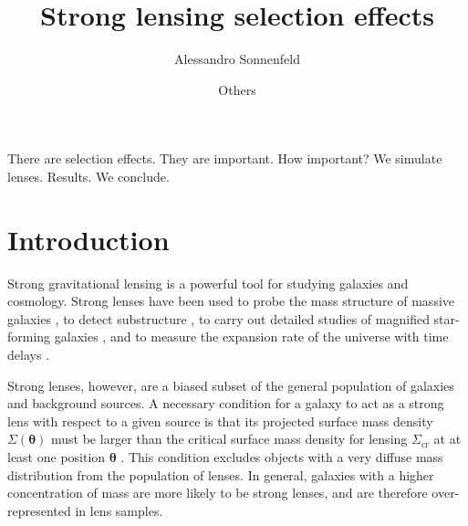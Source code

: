 \documentclass{aa}
\begin{document}
 


   \title{Strong lensing selection effects}

   \author{Alessandro Sonnenfeld\and
           Others
          }


   \date{}

 
  \abstract
    {
There are selection effects. They are important.
}
   {
How important?
} 
   {
We simulate lenses.
}
   {
Results.
}
   {
We conclude.
}

   \maketitle
%

\section{Introduction}\label{sect:intro}

Strong gravitational lensing is a powerful tool for studying galaxies and cosmology.
Strong lenses have been used to probe the mass structure of massive galaxies \citep{Aug++10, ORF14, Son++15, Sha++21}, to detect substructure \citep{Veg++12, Hez++16, Nie++20}, to carry out detailed studies of magnified star-forming galaxies \citep{Jon++13}, and to measure the expansion rate of the universe with time delays \citep[see][for a review]{T+M16}.

Strong lenses, however, are a biased subset of the general population of galaxies and background sources.
A necessary condition for a galaxy to act as a strong lens with respect to a given source is that its projected surface mass density $\Sigma(\boldsymbol\theta)$ must be larger than the critical surface mass density for lensing $\Sigma_{\mathrm{cr}}$ at at least one position $\boldsymbol\theta$ \citep{SEF92}.
This condition excludes objects with a very diffuse mass distribution from the population of lenses.
In general, galaxies with a higher concentration of mass are more likely to be strong lenses, and are therefore over-represented in lens samples.
\end{document}
